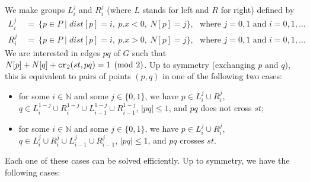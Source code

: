 \documentclass[a4paper,11pt]{article}
\newcommand{\NN}{\ensuremath{\mathbb N}}  %
\def\dist{\mathit{dist}}
\newcommand\CR{\mbox{\tt cr}_2}		  %
\let\le\leqslant
\begin{document}
We make groups $L_i^j$ and $R_i^j$ (where $L$ stands for left and $R$ for right) 
defined by
\begin{align*}
	L_i^j ~&=~ \{ p\in P \mid \dist[p]=i,~ p.x<0,~ N[p]=j \} ,
	~~~\text{where $j=0,1$ and $i=0,1,\dots$}\\
	R_i^j ~&=~ \{ p\in P \mid \dist[p]=i,~ p.x>0,~ N[p]=j \} ,
	~~~\text{where $j=0,1$ and $i=0,1,\dots$}
\end{align*}
We are interested in edges $pq$ of $G$ such that $N[p]+N[q]+\CR(st,pq)=1 \pmod 2$. 
Up to symmetry (exchanging $p$ and $q$), this is equivalent to pairs of points
$(p,q)$ in one of the following two cases:
\begin{itemize}
	\item for some $i\in \NN$ and some $j\in \{0,1\}$, we have
			$p\in L_i^j\cup R_i^j$, 
			$q\in L_i^{1-j}\cup R_i^{1-j}\cup L_{i-1}^{1-j}\cup R_{i-1}^{1-j}$, 
			$|pq|\le 1$, and $pq$ does not cross $st$;
	\item for some $i\in \NN$ and some $j\in \{0,1\}$, we have
			$p\in L_i^j\cup R_i^j$, 
			$q\in L_i^{j}\cup R_i^{j}\cup L_{i-1}^{j}\cup R_{i-1}^{j}$, 
			$|pq|\le 1$, and $pq$ crosses $st$.
\end{itemize}
Each one of these cases can be solved efficiently.
Up to symmetry, we have the following cases:
\end{document}
